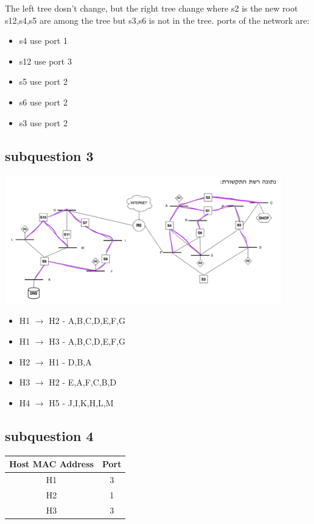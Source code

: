 \documentclass{article}
\begin{document}
    The left tree dosn't change, but the right tree change where s2 is the new root
    s12,s4,s5 are among the tree but s3,s6 is not in the tree.
    ports of the network are:
    \begin{itemize}
        \item s4 use port 1 
        \item s12 use port 3 
        \item s5 use port 2 
        \item s6 use port 2 
        \item s3 use port 2 
    \end{itemize}

    \subsection{subquestion 3}
    \includegraphics[width=0.9\textwidth]{stp.png}
    \begin{itemize}
        \item H1 $\rightarrow $ H2 - A,B,C,D,E,F,G
        \item H1 $\rightarrow $ H3 - A,B,C,D,E,F,G
        \item H2 $\rightarrow $ H1 - D,B,A
        \item H3 $\rightarrow $ H2 - E,A,F,C,B,D
        \item H4 $\rightarrow $ H5 - J,I,K,H,L,M
    \end{itemize}

    \subsection{subquestion 4}
    \begin{table}[ht]
        \centering
        \begin{tabular}{|c|c|}
            \hline
            \textbf{Host MAC Address} & \textbf{Port} \\
            \hline
            H1 & 3 \\
            \hline
            H2 & 1 \\
            \hline
            H3 & 3 \\
            \hline
        \end{tabular}
    \end{table}
\end{document}
